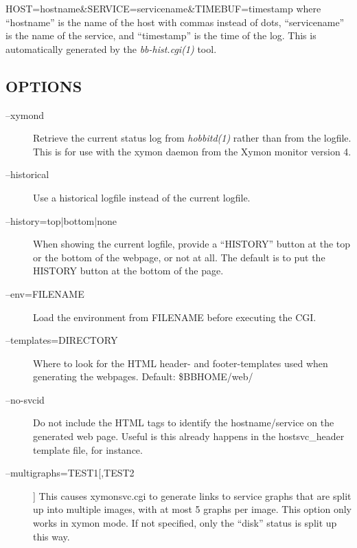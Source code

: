 HOST=hostname\&SERVICE=servicename\&TIMEBUF=timestamp  
 where ``hostname'' is the name of the host with commas instead of dots, ``servicename'' is the name of the service, and ``timestamp'' is the time of the log. This is automatically generated by the \emph{bb-hist.cgi(1)}
 tool. 



\subsection{OPTIONS}
\begin{description}
\item[--xymond] Retrieve the current status log from \emph{hobbitd(1)}
 rather than from the logfile. This is for use with the xymon daemon from the Xymon monitor version 4. 

 

\item[--historical] Use a historical logfile instead of the current logfile. 

 

\item[--history={top|bottom|none}] When showing the current logfile, provide a ``HISTORY'' button at the top or the bottom of the webpage, or not at all. The default is to put the HISTORY button at the bottom of the page. 

 

\item[--env=FILENAME] Load the environment from FILENAME before executing the CGI. 

 

\item[--templates=DIRECTORY] Where to look for the HTML header- and footer-templates used when generating the webpages. Default: \$BBHOME/web/ 

 

\item[--no-svcid] Do not include the HTML tags to identify the hostname/service on the generated web page. Useful is this already happens in the hostsvc\_header template file, for instance. 

 

\item[--multigraphs=TEST1[,TEST2]] This causes xymonsvc.cgi to generate links to service graphs that are split up into multiple images, with at most 5 graphs per image. This option only works in xymon mode. If not specified, only the ``disk'' status is split up this way. 


\end{description}
